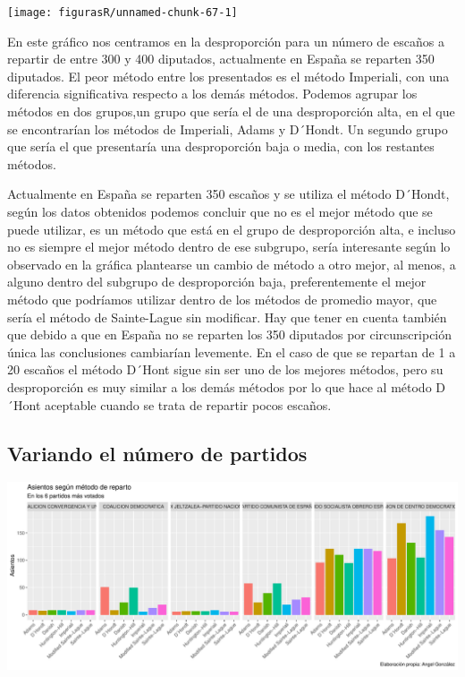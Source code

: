\documentclass[12pt,a4paper,]{book}
\numberwithin{dummy}{section}
\theoremstyle{ocrenumbox}
\theoremstyle{blacknumex}
\theoremstyle{blacknumbox}
\theoremstyle{ocrenum}
\theoremstyle{ocrenum}
\begin{document}
\begin{center}\texttt{[image: figurasR/unnamed-chunk-67-1]} \end{center}

En este gráfico nos centramos en la desproporción para un número de
escaños a repartir de entre 300 y 400 diputados, actualmente en España
se reparten 350 diputados. El peor método entre los presentados es el
método Imperiali, con una diferencia significativa respecto a los demás
métodos. Podemos agrupar los métodos en dos grupos,un grupo que sería el
de una desproporción alta, en el que se encontrarían los métodos de
Imperiali, Adams y D´Hondt. Un segundo grupo que sería el que
presentaría una desproporción baja o media, con los restantes métodos.

Actualmente en España se reparten 350 escaños y se utiliza el método
D´Hondt, según los datos obtenidos podemos concluir que no es el mejor
método que se puede utilizar, es un método que está en el grupo de
desproporción alta, e incluso no es siempre el mejor método dentro de
ese subgrupo, sería interesante según lo observado en la gráfica
plantearse un cambio de método a otro mejor, al menos, a alguno dentro
del subgrupo de desproporción baja, preferentemente el mejor método que
podríamos utilizar dentro de los métodos de promedio mayor, que sería el
método de Sainte-Lague sin modificar. Hay que tener en cuenta también
que debido a que en España no se reparten los 350 diputados por
circunscripción única las conclusiones cambiarían levemente. En el caso
de que se repartan de 1 a 20 escaños el método D´Hont sigue sin ser uno
de los mejores métodos, pero su desproporción es muy similar a los demás
métodos por lo que hace al método D´Hont aceptable cuando se trata de
repartir pocos escaños.

\hypertarget{variando-el-nuxfamero-de-partidos}{%
\subsection{Variando el número de
partidos}\label{variando-el-nuxfamero-de-partidos}}

\begin{center}\includegraphics[width=0.95\linewidth]{figurasR/unnamed-chunk-68-1} \end{center}
\end{document}
